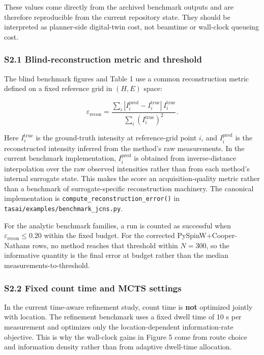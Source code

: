 \documentclass[
]{article}
\begin{document}
These values come directly from the archived benchmark outputs and are
therefore reproducible from the current repository state. They should be
interpreted as planner-side digital-twin cost, not beamtime or
wall-clock queueing cost.

\hypertarget{s2.1-blind-reconstruction-metric-and-threshold}{%
\subsubsection{S2.1 Blind-reconstruction metric and
threshold}\label{s2.1-blind-reconstruction-metric-and-threshold}}

The blind benchmark figures and Table 1 use a common reconstruction
metric defined on a fixed reference grid in \((H,E)\) space:

\[
\varepsilon_{\mathrm{recon}}
=
\frac{\sum_i \left|I_i^{\mathrm{pred}}-I_i^{\mathrm{true}}\right|\,I_i^{\mathrm{true}}}
{\sum_i \left(I_i^{\mathrm{true}}\right)^2}.
\]

Here \(I_i^{\mathrm{true}}\) is the ground-truth intensity at
reference-grid point \(i\), and \(I_i^{\mathrm{pred}}\) is the
reconstructed intensity inferred from the method's raw measurements. In
the current benchmark implementation, \(I_i^{\mathrm{pred}}\) is
obtained from inverse-distance interpolation over the raw observed
intensities rather than from each method's internal surrogate state.
This makes the score an acquisition-quality metric rather than a
benchmark of surrogate-specific reconstruction machinery. The canonical
implementation is \texttt{compute\_reconstruction\_error()} in
\texttt{tasai/examples/benchmark\_jcns.py}.

For the analytic benchmark families, a run is counted as successful when
\(\varepsilon_{\mathrm{recon}} \le 0.20\) within the fixed budget. For
the corrected PySpinW+Cooper-Nathans rows, no method reaches that
threshold within \(N=300\), so the informative quantity is the final
error at budget rather than the median measurements-to-threshold.

\hypertarget{s2.2-fixed-count-time-and-mcts-settings}{%
\subsubsection{S2.2 Fixed count time and MCTS
settings}\label{s2.2-fixed-count-time-and-mcts-settings}}

In the current time-aware refinement study, count time is \textbf{not}
optimized jointly with location. The refinement benchmark uses a fixed
dwell time of 10 s per measurement and optimizes only the
location-dependent information-rate objective. This is why the
wall-clock gains in Figure 5 come from route choice and information
density rather than from adaptive dwell-time allocation.
\end{document}
